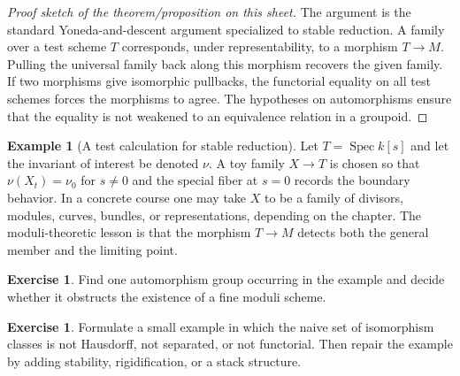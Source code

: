 \documentclass[11pt]{amsart}
\theoremstyle{definition}
\newtheorem{example}[theorem]{Example}
\newtheorem{exercise}[theorem]{Exercise}
\newcommand{\Spec}{\operatorname{Spec}}
\begin{document}
\begin{proof}[Proof sketch of the theorem/proposition on this sheet]
The argument is the standard Yoneda-and-descent argument specialized to stable reduction.  A family over a test scheme $T$ corresponds, under representability, to a morphism $T\to M$.  Pulling the universal family back along this morphism recovers the given family.  If two morphisms give isomorphic pullbacks, the functorial equality on all test schemes forces the morphisms to agree.  The hypotheses on automorphisms ensure that the equality is not weakened to an equivalence relation in a groupoid.
\end{proof}
\begin{example}[A test calculation for stable reduction]
Let $T=\Spec k[s]$ and let the invariant of interest be denoted $\nu$.  A toy family $X\to T$ is chosen so that $\nu(X_t)=\nu_0$ for $s\ne0$ and the special fiber at $s=0$ records the boundary behavior.  In a concrete course one may take $X$ to be a family of divisors, modules, curves, bundles, or representations, depending on the chapter.  The moduli-theoretic lesson is that the morphism $T\to M$ detects both the general member and the limiting point.
\end{example}
\begin{exercise}
Find one automorphism group occurring in the example and decide whether it obstructs the existence of a fine moduli scheme.
\end{exercise}
\begin{exercise}
Formulate a small example in which the naive set of isomorphism classes is not Hausdorff, not separated, or not functorial.  Then repair the example by adding stability, rigidification, or a stack structure.
\end{exercise}
\clearpage
\end{document}

